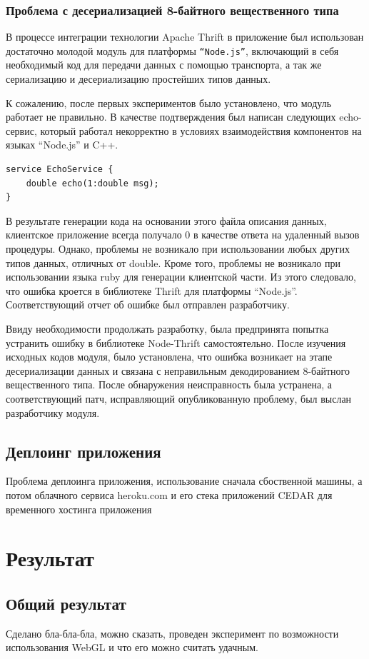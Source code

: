 \documentclass[12pt, a4paper]{article}
\let\stdsection\section
\renewcommand\section{\newpage\stdsection}
\begin{document}
\subsubsection{Проблема с десериализацией 8-байтного вещественного типа}
В процессе интеграции технологии Apache Thrift в приложение был использован
достаточно молодой модуль для платформы \texttt{``Node.js''}, включающий в себя
необходимый код для передачи данных с помощью транспорта, а так же сериализацию
и десериализацию простейших типов данных.

К сожалению, после первых экспериментов было установлено, что модуль работает не
правильно. В качестве подтверждения был написан следующих echo-сервис, который
работал некорректно в условиях взаимодействия компонентов на языках ``Node.js'' и
C++.
\begin{lstlisting}
service EchoService {
    double echo(1:double msg);
}
\end{lstlisting}
В результате генерации кода на основании этого файла описания данных,
клиентское приложение всегда получало 0 в качестве ответа на удаленный
вызов процедуры. Однако, проблемы не возникало при использовании любых других
типов данных, отличных от double. Кроме того, проблемы не возникало при
использовании языка ruby для генерации клиентской части. Из этого следовало, что
ошибка кроется в библиотеке Thrift для платформы ``Node.js''. Соответствующий отчет
об ошибке был отправлен разработчику.

Ввиду необходимости продолжать разработку, была предпринята попытка устранить
ошибку в библиотеке Node-Thrift самостоятельно. После изучения исходных
кодов модуля, было установлена, что ошибка возникает на этапе десериализации
данных и связана с неправильным декодированием 8-байтного вещественного типа.
После обнаружения неисправность была устранена, а соответствующий патч,
исправляющий опубликованную проблему, был выслан разработчику модуля.

\subsection{Деплоинг приложения}
Проблема деплоинга приложения, использование сначала сбоственной машины, а потом
облачного сервиса heroku.com и его стека приложений CEDAR для временного
хостинга приложения

\section{Результат}
\subsection{Общий результат}
Сделано бла-бла-бла, можно сказать, проведен эксперимент по возможности
использования WebGL и что его можно считать удачным.
\end{document}
